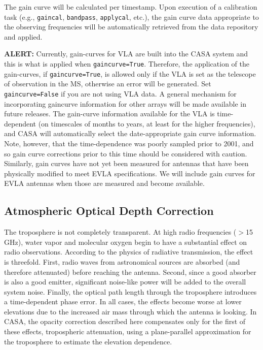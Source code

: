 The gain curve will be calculated per timestamp.  Upon execution of a
calibration task (e.g., {\tt gaincal}, {\tt bandpass}, {\tt applycal}, 
etc.), the gain
curve data appropriate to the observing frequencies will be
automatically retrieved from the data repository and applied.

{\bf ALERT:} Currently, gain-curves for VLA are built into
the CASA system and this is what is applied when {\tt gaincurve=True}.
Therefore, the application of the gain-curves, if {\tt gaincurve=True},
is allowed only if the VLA is set as the telescope of observation
in the MS, otherwise an error will be generated.
Set {\tt gaincurve=False} if you are not using VLA data.  
A general mechanism for incorporating gaincurve information for
other arrays will be made available in future releases.
The gain-curve information available for the VLA is
time-dependent (on timescales of months to years, at least for the 
higher frequencies), and CASA will automatically select 
the date-appropriate gain curve information.  Note, however, that 
the time-dependence was poorly sampled prior to 2001, and so gain 
curve corrections prior to this time should be considered with caution.  
Similarly, gain curves have not yet been measured for antennas that 
have been physically modified to meet EVLA specifications.
We will include gain curves for EVLA antennas when those are measured
and become available.

\subsection{Atmospheric Optical Depth Correction}
\label{section:cal.prior.opacity}

The troposphere is not completely transparent.  At high radio
frequencies ($>$15 GHz), water vapor and molecular oxygen begin to
have a substantial effect on radio observations. According to the
physics of radiative transmission, the effect is threefold.  First,
radio waves from astronomical sources are absorbed (and therefore
attenuated) before reaching the antenna.  Second, since a good absorber
is also a good emitter, significant noise-like power will be added to
the overall system noise.  Finally, the optical path length through
the troposphere introduces a time-dependent phase error.  In all
cases, the effects become worse at lower elevations due to the
increased air mass through which the antenna is looking.  In CASA,
the opacity correction described here compensates only for the first
of these effects, tropospheric attenuation, using a plane-parallel
approximation for the troposphere to estimate the elevation
dependence.

